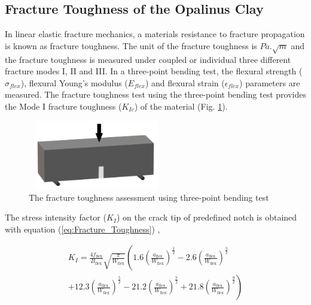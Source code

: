 \subsection{Fracture Toughness of the Opalinus Clay}
\label{sec:Fracture_Toughness_Exp}

In linear elastic fracture mechanics, a materials resistance to fracture propagation is known as fracture toughness. The unit of the fracture toughness is $Pa.\sqrt m$ and the fracture toughness is measured under coupled or individual three different fracture modes I, II and III. In a three-point bending test, the flexural strength ($\sigma_{flex}$), flexural Young's modulus ($E_{flex}$) and flexural strain ($\epsilon_{flex}$) parameters are measured. The fracture toughness test using the three-point bending test provides the Mode I fracture toughness ($K_{Ic}$) of the material (Fig.  \ref{fig:Amir_Fracture_Toughness_Theory}).

\begin{figure}[!ht]
\centering
\includegraphics[width=6cm,height=3cm]{figures/Amir_Fracture_Toughness_Theory.png}
\caption{The fracture toughness assessment using three-point bending test}
\label{fig:Amir_Fracture_Toughness_Theory}
\end{figure} 

The stress intensity factor ($K_I$) on the crack tip of predefined notch is obtained with equation (\ref{eq:Fracture_Toughness}) \cite{Bower2009},

\begin{multline}
\label{eq:Fracture_Toughness}
K_I=
\frac{4f_\text{flex}}{B_\text{flex}}
\sqrt{\frac{\pi}{W_\text{flex}}}
\left(1.6
\left(\frac{a_\text{flex}}{W_\text{flex}}\right)^\frac{1}{2}
-
2.6\left(\frac{a_\text{flex}}{W_\text{flex}}\right)^\frac{3}{2} 
\right.
\\ 
\left.
+12.3\left(\frac{a_\text{flex}}{W_\text{flex}}\right)^\frac{5}{2} -21.2\left(\frac{a_\text{flex}}{W_\text{flex}}\right)^\frac{7}{2}
+21.8\left(\frac{a_\text{flex}}{W_\text{flex}}\right)^\frac{9}{2}
\right)
\end{multline}

